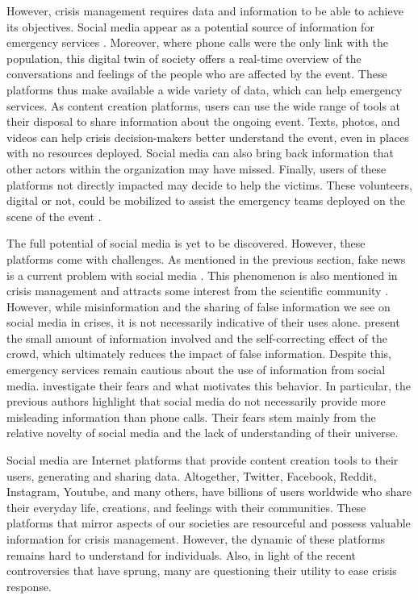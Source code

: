 However, crisis management requires data and information to be able to achieve its objectives.
Social media appear as a potential source of information for emergency services \parencite{tapiaSeekingTrustworthyTweet2011}.
Moreover, where phone calls were the only link with the population, this digital twin of society offers a real-time overview of the conversations and feelings of the people who are affected by the event.
These platforms thus make available a wide variety of data, which can help emergency services.
As content creation platforms, users can use the wide range of tools at their disposal to share information about the ongoing event.
Texts, photos, and videos can help crisis decision-makers better understand the event, even in places with no resources deployed.
Social media can also bring back information that other actors within the organization may have missed.
Finally, users of these platforms not directly impacted may decide to help the victims.
These volunteers, digital or not, could be mobilized to assist the emergency teams deployed on the scene of the event \parencite{batardIntegrerContributionsCitoyennes2021}.

The full potential of social media is yet to be discovered.
However, these platforms come with challenges.
As mentioned in the previous section, fake news is a current problem with social media \parencite{lazerScienceFakeNews2018,vosoughiSpreadTrueFalse2018,oshikawaSurveyNaturalLanguage2018}.
This phenomenon is also mentioned in crisis management and attracts some interest from the scientific community \parencite{starbirdExaminingAlternativeMedia2017,sellMisinformationUSEbola2020}.
However, while misinformation and the sharing of false information we see on social media in crises, it is not necessarily indicative of their uses alone.
\textcite{bubendorffConstructionDisseminationInformation2021} present the small amount of information involved and the self-correcting effect of the crowd, which ultimately reduces the impact of false information.
Despite this, emergency services remain cautious about the use of information from social media.
\textcite{tapiaGoodEnoughGood2014} investigate their fears and what motivates this behavior.
In particular, the previous authors highlight that social media do not necessarily provide more misleading information than phone calls.
Their fears stem mainly from the relative novelty of social media and the lack of understanding of their universe.

Social media are Internet platforms that provide content creation tools to their users, generating and sharing data.
Altogether, Twitter, Facebook, Reddit, Instagram, Youtube, and many others, have billions of users worldwide who share their everyday life, creations, and feelings with their communities.
These platforms that mirror aspects of our societies are resourceful and possess valuable information for crisis management.
However, the dynamic of these platforms remains hard to understand for individuals.
Also, in light of the recent controversies that have sprung, many are questioning their utility to ease crisis response.

